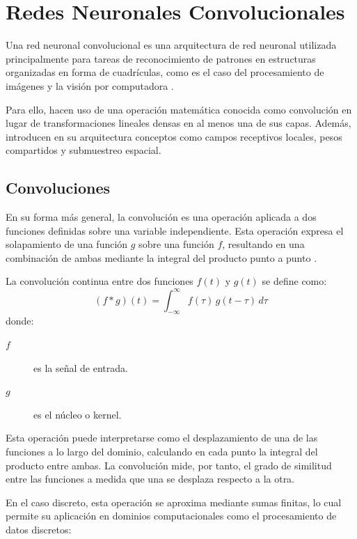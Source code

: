 \section{Redes Neuronales Convolucionales}
Una red neuronal convolucional es una arquitectura de red neuronal utilizada
principalmente para tareas de reconocimiento de patrones en estructuras organizadas
en forma de cuadrículas, como es el caso del procesamiento de imágenes y la visión
por computadora \parencite[p.326]{Goodfellow-et-al-2016}.
\medskip

Para ello, hacen uso de una operación matemática conocida como convolución en lugar de
transformaciones lineales densas en al menos una de sus capas. Además, introducen en su
arquitectura conceptos como campos receptivos locales, pesos compartidos y
submuestreo espacial.

\subsection{Convoluciones}
En su forma más general, la convolución es una operación aplicada a dos funciones
definidas sobre una variable independiente. Esta operación expresa el solapamiento
de una función $g$ sobre una función $f$, resultando en una combinación de ambas
mediante la integral del producto punto a punto \parencite{weisstein2003convolution}.
\medskip

La convolución continua entre dos funciones $f(t)$ y $g(t)$ se define como:
\begin{equation}
    (f * g)(t) = \int_{-\infty}^{\infty} f(\tau)\, g(t - \tau)\, d\tau
    \label{eq:conv_continua}
\end{equation}
donde:
\begin{description}
    \item[$f$] es la señal de entrada.
    \item[$g$] es el núcleo o kernel.
\end{description}

Esta operación puede interpretarse como el desplazamiento de una de las funciones
a lo largo del dominio, calculando en cada punto la integral del producto entre
ambas. La convolución mide, por tanto, el grado de similitud entre las funciones
a medida que una se desplaza respecto a la otra.
\medskip

En el caso discreto, esta operación se aproxima mediante sumas finitas, lo cual
permite su aplicación en dominios computacionales como el procesamiento de datos
discretos:

